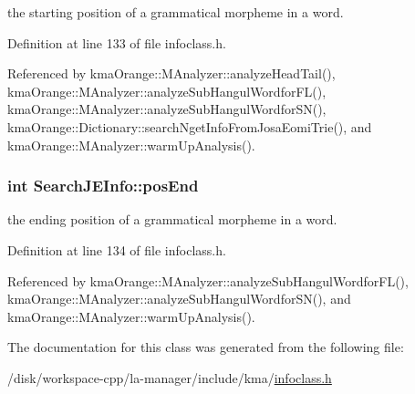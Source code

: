 the starting position of a grammatical morpheme in a word. 



Definition at line 133 of file infoclass.h.

Referenced by kmaOrange::MAnalyzer::analyzeHeadTail(), kmaOrange::MAnalyzer::analyzeSubHangulWordforFL(), kmaOrange::MAnalyzer::analyzeSubHangulWordforSN(), kmaOrange::Dictionary::searchNgetInfoFromJosaEomiTrie(), and kmaOrange::MAnalyzer::warmUpAnalysis().\hypertarget{classSearchJEInfo_9fe8ff0266d11342a2f5833d2a9016b0}{
\subsubsection[{posEnd}]{\setlength{\rightskip}{0pt plus 5cm}int {\bf SearchJEInfo::posEnd}}}
\label{classSearchJEInfo_9fe8ff0266d11342a2f5833d2a9016b0}


the ending position of a grammatical morpheme in a word. 



Definition at line 134 of file infoclass.h.

Referenced by kmaOrange::MAnalyzer::analyzeSubHangulWordforFL(), kmaOrange::MAnalyzer::analyzeSubHangulWordforSN(), and kmaOrange::MAnalyzer::warmUpAnalysis().

The documentation for this class was generated from the following file:\begin{CompactItemize}
\item 
/disk/workspace-cpp/la-manager/include/kma/\hyperlink{infoclass_8h}{infoclass.h}\end{CompactItemize}
